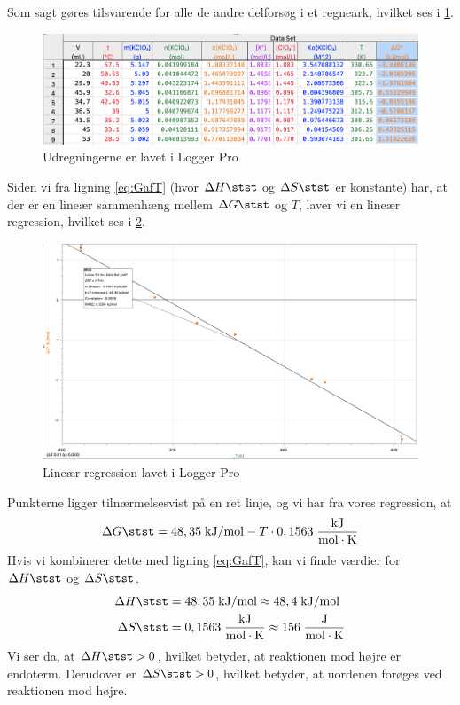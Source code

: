 \documentclass{report}
\begin{document}
Som sagt gøres tilsvarende for alle de andre delforsøg i et regneark, hvilket ses i \cref{fig:regneark}.
\begin{figure}[H]
\begin{center}
  \includegraphics[width=\textwidth]{regneark.png}
\end{center}
\caption{Udregningerne er lavet i Logger Pro}
\label{fig:regneark}
\end{figure}
Siden vi fra ligning \ref{eq:GafT} (hvor $\Delta H \stst $ og $\Delta S \stst $ er konstante) har, at der er en lineær sammenhæng mellem $\Delta G \stst $ og $T$, laver vi en lineær regression, hvilket ses i \cref{fig:regression}.
\begin{figure}[H]
\begin{center}
  \includegraphics[width=\textwidth]{regression.png }
\end{center}
\caption{Lineær regression lavet i Logger Pro}
\label{fig:regression}
\end{figure}
Punkterne ligger tilnærmelsesvist på en ret linje, og vi har fra vores regression, at 
\[
\Delta G \stst =48,35 \;\unit{kJ/mol} -T \cdot 0,1563 \;\unit{\frac{kJ}{mol \cdot K}} 
\] 
Hvis vi kombinerer dette med ligning \ref{eq:GafT}, kan vi finde værdier for $\Delta H \stst $ og $\Delta S \stst $. 
\begin{equation*}
\begin{split}
  \Delta H \stst &=48,35 \;\unit{kJ/mol} \approx 48,4 \;\unit{kJ/mol} \\
  \Delta S \stst &=0,1563 \;\unit{\frac{kJ}{mol \cdot K}} \approx 156 \;\unit{\frac{J}{mol \cdot K}}
\end{split}
\end{equation*}
Vi ser da, at $\Delta H \stst > 0$, hvilket betyder, at reaktionen mod højre er endoterm.
Derudover er $\Delta S \stst > 0$, hvilket betyder, at uordenen forøges ved reaktionen mod højre.
\end{document}

